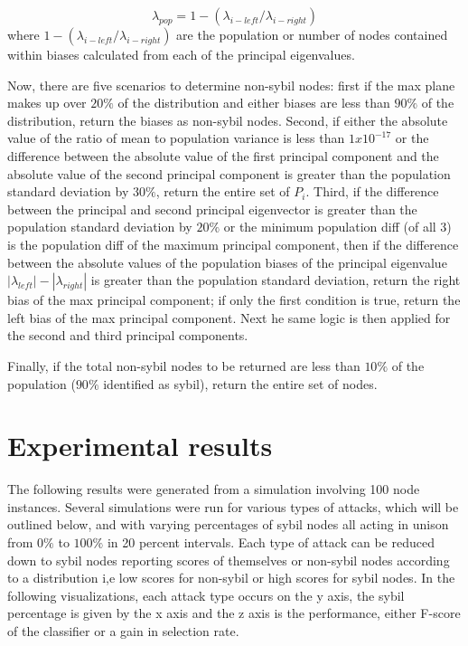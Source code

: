 \documentclass{article}
\begin{document}
\begin{equation}
\lambda_{pop} = 1-(\lambda_{i-left}/\lambda_{i-right})
\end{equation}
where $1-(\lambda_{i-left}/\lambda_{i-right})$  are the population or number of nodes contained within biases calculated from each of the principal eigenvalues.

Now, there are five scenarios to determine non-sybil nodes: first if the max plane makes up over $20\%$ of the distribution and either biases are less than $90\%$ of the distribution, return the biases as non-sybil nodes. Second, if either the absolute value of the ratio of mean to population variance is less than $1x10^{-17}$ or the difference between the absolute value of the first principal component and the  absolute value of the second principal component is greater than the population standard deviation by $30\%$, return the entire set of $P_i$. Third, if the difference between the principal and second principal eigenvector is greater than the population standard deviation by $20\%$ or the minimum population diff (of all 3) is the population diff of the maximum principal component, then if the difference between the absolute values of the population biases of the principal eigenvalue $|\lambda_{left}| - |\lambda_{right}|$ is greater than the population standard deviation, return the right bias of the max principal component; if only the first condition is true, return the left bias of the max principal component. Next he same logic is then applied for the second and third principal components. 

Finally, if the total non-sybil nodes to be returned are less than $10\%$ of the population ($90\%$ identified as sybil), return the entire set of nodes.

\section{Experimental results}
The following results were generated from a simulation involving 100 node instances. Several simulations were run for various types of attacks, which will be outlined below, and with varying percentages of sybil nodes all acting in unison from $0\%$ to $100\%$ in 20 percent intervals. Each type of attack can be reduced down to sybil nodes reporting scores of themselves or non-sybil nodes according to a distribution i,e low scores for non-sybil or high scores for sybil nodes. In the following visualizations, each attack type occurs on the y axis, the sybil percentage is given by the x axis and the z axis is the performance, either F-score of the classifier or a gain in selection rate.
\end{document}

